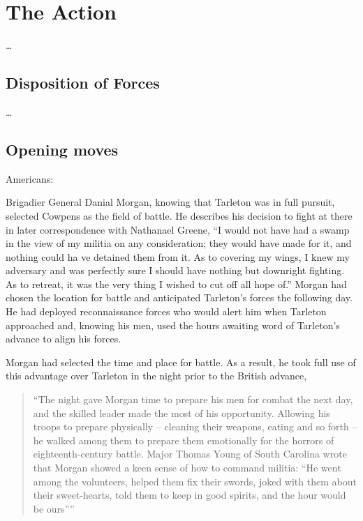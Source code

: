 \section{The Action}

\ldots

\subsection{Disposition of Forces}

\ldots

\subsection{Opening moves}

Americans:

Brigadier General Danial Morgan, knowing that Tarleton was in full pursuit,
selected Cowpens as the field of battle. He describes his decision to fight at
there in later correspondence with Nathanael Greene, ``I would not have had a
swamp in the view of my militia on any consideration; they would have made for
it, and nothing could ha ve detained them from it. As to covering my wings, I
knew my adversary and was perfectly sure I should have nothing but downright
fighting. As to retreat, it was the very thing I wished to cut off all hope of.''
\cite[46]{moncure_cowpens_1996} Morgan had chosen the location for battle and anticipated
Tarleton's forces the following day. He had deployed reconnaissance forces who
would alert him when Tarleton approached and, knowing his men, used the hours
awaiting word of Tarleton's advance to align his forces.

Morgan had selected the time and place for battle. As a result, he took full
use of this advantage over Tarleton in the night prior to the British advance,

\begin{quote}
  ``The night gave Morgan time to prepare his men for combat the next day, and
  the skilled leader made the most of his opportunity. Allowing his troops to
  prepare physically -- cleaning their weapons, eating and so forth -- he walked
  among them to prepare them emotionally for the horrors of eighteenth-century
  battle. Major Thomas Young of South Carolina wrote that Morgan showed a keen
  sense of how to command militia: ``He went among the volunteers, helped them
  fix their swords, joked with them about their sweet-hearts, told them to keep
  in good spirits, and the hour would be ours'''' \cite[47]{moncure_cowpens_1996}
\end{quote}

